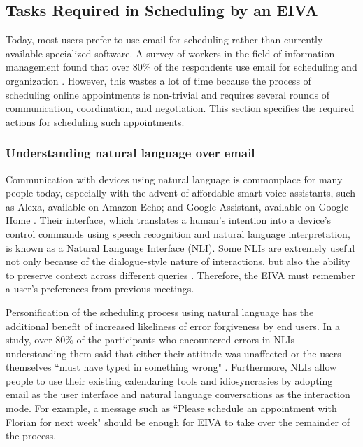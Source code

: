 \documentclass{article}
\begin{document}
\subsection{Tasks Required in Scheduling by an EIVA}

Today, most users prefer to use email for scheduling rather than currently available specialized software. A survey of workers in the field of information management found that over 80\% of the respondents use email for scheduling and organization \cite{ducheneaut_e-mail_2001}. However, this wastes a lot of time because the process of scheduling online appointments is non-trivial and requires several rounds of communication, coordination, and negotiation. This section specifies the required actions for scheduling such appointments.

\subsubsection{Understanding natural language over email}

Communication with devices using natural language is commonplace for many people today, especially with the advent of affordable smart voice assistants, such as Alexa, available on Amazon Echo; and Google Assistant, available on Google Home \cite{de_barcelos_silva_intelligent_2020}. Their interface, which translates a human's intention into a device's control commands using speech recognition and natural language interpretation, is known as a Natural Language Interface (NLI). Some NLIs are extremely useful not only because of the dialogue-style nature of interactions, but also the ability to preserve context across different queries \cite{kiseleva_predicting_2016}. Therefore, the EIVA must remember a user's preferences from previous meetings. 

Personification of the scheduling process using natural language has the additional benefit of increased likeliness of error forgiveness by end users. In a study, over 80\% of the participants who encountered errors in NLIs understanding them said that either their attitude was unaffected or the users themselves ``must have typed in something wrong" \cite{kelley_iterative_1984}. Furthermore, NLIs allow people to use their existing calendaring tools and idiosyncrasies by adopting email as the user interface and natural language conversations as the interaction mode. For example, a message such as ``Please schedule an appointment with Florian for next week" should be enough for EIVA to take over the remainder of the process.
\end{document}
